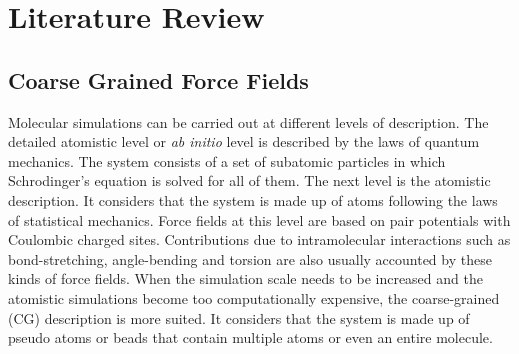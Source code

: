 
\chapter{Literature Review} %

\label{Chapter2} %
\section{Coarse Grained Force Fields}


Molecular simulations can be carried out at different levels of description. The detailed atomistic level or \textit{ab initio} level is described by the laws of quantum mechanics. The system consists of a set of subatomic particles in which Schrodinger's equation is solved for all of them. The next level is the atomistic description. It considers that the system is made up of atoms following the laws of statistical mechanics.  Force fields at this level are based on pair potentials with Coulombic charged sites. Contributions due to intramolecular interactions such as bond-stretching, angle-bending and torsion are also usually accounted by these kinds of force fields. When the simulation scale needs to be increased and the atomistic simulations become too computationally expensive, the coarse-grained (CG) description is more suited. It considers that the system is made up of pseudo atoms or beads that contain multiple atoms or even an entire molecule. 

